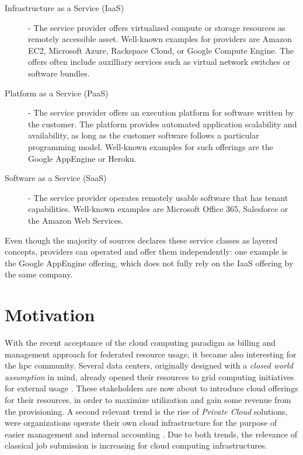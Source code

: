 \documentclass[twocolumn]{svjour3}       %
\begin{document}
\begin{description}
\item[Infrastructure as a Service (IaaS)] - The service provider offers virtualized compute or storage resources as remotely accessible asset. Well-known examples for providers are Amazon EC2, Microsoft Azure, Rackspace Cloud, or Google Compute Engine. The offers often include auxilliary services such as virtual network switches or software bundles. 
\item[Platform as a Service (PaaS)] - The service provider offers an execution platform for software written by the customer. The platform provides automated application scalability and availability, as long as the customer software follows a particular programming model. Well-known examples for such offerings are the Google AppEngine or Heroku.
\item[Software as a Service (SaaS)] - The service provider operates remotely usable software that has tenant capabilities. Well-known examples are Microsoft Office 365, Salesforce or the Amazon Web Services. 
\end{description}

Even though the majority of sources declares these service classes as layered concepts, providers can operated and offer them independently: one example is the Google AppEngine offering, which does not fully rely on the IaaS offering by the same company.

\section{Motivation}

With the recent acceptance of the cloud computing paradigm as billing and management approach for federated resource usage, it became also interesting for the \gls{hpc} community. Several data centers, originally designed with a \emph{closed world assumption} in mind, already opened their resources to grid computing initiatives for external usage \cite{unicore}. These stakeholders are now about to introduce cloud offerings for their resources, in order to maximize utilization and gain some revenue from the provisioning. A second relevant trend is the rise of \emph{Private Cloud} solutions, were organizations operate their own cloud infrastructure for the purpose of easier management and internal accounting \cite{citemaster_9646}. Due to both trends, the relevance of classical job submission is increasing for cloud computing infrastructures. 
\end{document}

